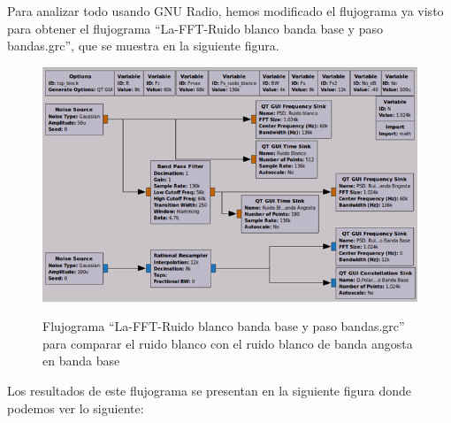 Para analizar todo usando GNU Radio, hemos modificado el flujograma ya visto para obtener el flujograma “La-FFT-Ruido blanco banda base y paso bandas.grc”, que se muestra en la siguiente figura.

\vspace{300px}
\begin{figure}[h!]
	\captionsetup{justification = raggedright, singlelinecheck = false}
	\caption{Flujograma “La-FFT-Ruido blanco banda base y paso bandas.grc” para comparar el ruido blanco con el ruido blanco de banda angosta en banda base} 
	\centering
	\includegraphics[scale=0.7]{Imagenes/Ruido.png}
	\label{fig:Ruido}
\end{figure}

Los resultados de este flujograma se presentan en la siguiente figura donde podemos ver lo siguiente:

